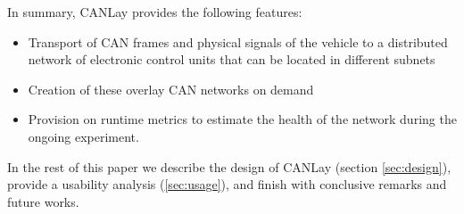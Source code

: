 \documentclass[letterpaper,twocolumn,12pt]{article}
\begin{document}
In summary, CANLay provides the following features:
\begin{itemize}
    \item Transport of CAN frames and physical signals of the vehicle to a distributed network of electronic control units that can be located in different subnets
    \item Creation of these overlay CAN networks on demand
    \item Provision on runtime metrics to estimate the health of the network during the ongoing experiment.
\end{itemize}
In the rest of this paper we describe the design of CANLay (section \ref{sec:design}), provide a usability analysis (\ref{sec:usage}), and finish with conclusive remarks and future works.


\end{document}
